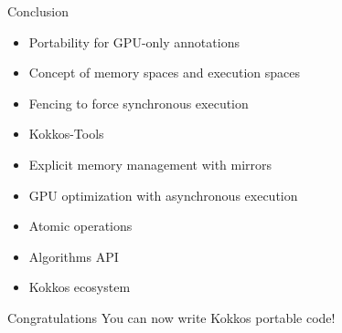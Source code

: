 \documentclass[
    aspectratio=169,
]{beamer}
\begin{document}
\begin{frame}{Conclusion}
    \begin{itemize}
        \item Portability for GPU-only annotations
        \item Concept of memory spaces and execution spaces
        \item Fencing to force synchronous execution
        \item Kokkos-Tools
        \item Explicit memory management with mirrors
        \item GPU optimization with asynchronous execution
        \item Atomic operations
        \item Algorithms API
        \item Kokkos ecosystem
    \end{itemize}
    \pause
    \begin{block}{Congratulations}
        You can now write Kokkos portable code!
    \end{block}
\end{frame}

\begin{frame}[plain]
    \closingpage
\end{frame}
\end{document}
